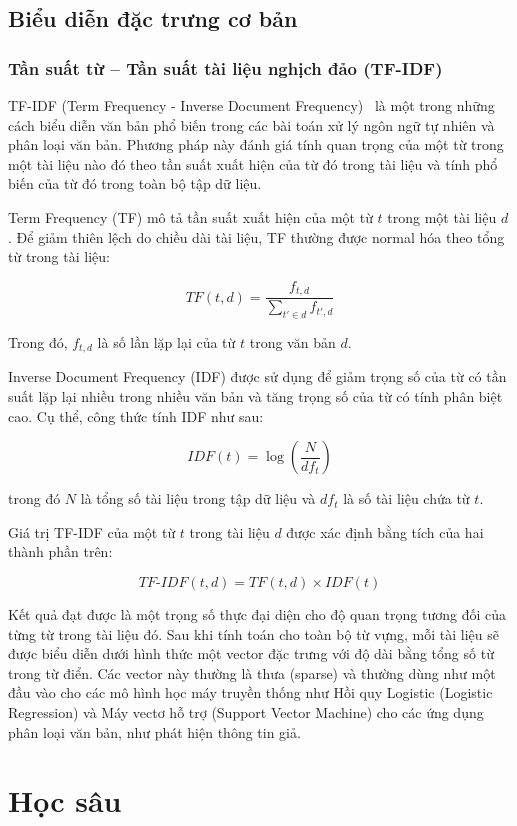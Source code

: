 \documentclass[12pt, a4paper]{report}
\begin{document}
\subsection{Biểu diễn đặc trưng cơ bản}
\subsubsection{Tần suất từ -- Tần suất tài liệu nghịch đảo (TF-IDF)}
TF-IDF (Term Frequency - Inverse Document Frequency)~\cite{sparkjones1972idf} là một trong những cách biểu diễn văn bản phổ biến trong các bài toán xử lý ngôn ngữ tự nhiên và phân loại văn bản. Phương pháp này đánh giá tính quan trọng của một từ trong một tài liệu nào đó theo tần suất xuất hiện của từ đó trong tài liệu và tính phổ biến của từ đó trong toàn bộ tập dữ liệu.

Term Frequency (TF) mô tả tần suất xuất hiện của một từ $t$ trong một tài liệu $d$. Để giảm thiên lệch do chiều dài tài liệu, TF thường được normal hóa theo tổng từ trong tài liệu:

\[
TF(t, d) = \frac{f_{t,d}}{\sum_{t' \in d} f_{t',d}}
\]

Trong đó, $f_{t,d}$ là số lần lặp lại của từ $t$ trong văn bản $d$.

Inverse Document Frequency (IDF) được sử dụng để giảm trọng số của từ có tần suất lặp lại nhiều trong nhiều văn bản và tăng trọng số của từ có tính phân biệt cao. Cụ thể, công thức tính IDF như sau:

\[
IDF(t) = \log \left( \frac{N}{df_t} \right)
\]

trong đó $N$ là tổng số tài liệu trong tập dữ liệu và $df_t$ là số tài liệu chứa từ $t$.

Giá trị TF-IDF của một từ $t$ trong tài liệu $d$ được xác định bằng tích của hai thành phần trên:

\[
TF\text{-}IDF(t, d) = TF(t, d) \times IDF(t)
\]

Kết quả đạt được là một trọng số thực đại diện cho độ quan trọng tương đối của từng từ trong tài liệu đó. Sau khi tính toán cho toàn bộ từ vựng, mỗi tài liệu sẽ được biểu diễn dưới hình thức một vector đặc trưng với độ dài bằng tổng số từ trong từ điển. Các vector này thường là thưa (sparse) và thường dùng như một đầu vào cho các mô hình học máy truyền thống như Hồi quy Logistic (Logistic Regression) và Máy vectơ hỗ trợ (Support Vector Machine) cho các ứng dụng phân loại văn bản, như phát hiện thông tin giả.

\section{Học sâu}
\end{document}
